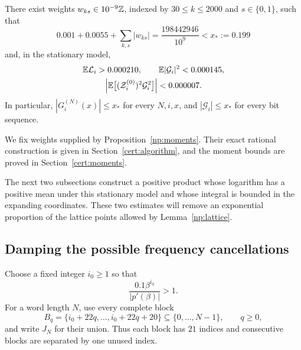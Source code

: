 \begin{proposition}\label{np:moments}\label{np:moment-bounds}
There exist weights \(w_{ks}\in10^{-9}\mathbb Z\), indexed by
\(30\le k\le2000\) and \(s\in\{0,1\}\), such that
\begin{equation}
 0.001+0.0055+\sum_{k,s}|w_{ks}|
   =\frac{198442946}{10^9}<x_*:=0.199
 \label{np:weight-sum}
\end{equation}
and, in the stationary model,
\begin{equation}
 \begin{gathered}
 \mathbb E\mathcal L_i>0.000210,\qquad
 \mathbb E|\mathcal G_i|^2<0.000145,\\
 \left|\mathbb E\bigl[(\mathcal Z_i^{(0)})^2\mathcal G_i^2\bigr]\right|
     <0.000007.
 \end{gathered}
 \label{np:moment-estimates}
\end{equation}
In particular, \(|G_i^{(N)}(x)|\le x_*\) for every \(N,i,x\), and
\(|\mathcal G_i|\le x_*\) for every bit sequence.
\end{proposition}

We fix weights supplied by Proposition~\ref{np:moments}. Their exact
rational construction is given in Section~\ref{cert:algorithm}, and the
moment bounds are proved in Section~\ref{cert:moments}.

The next two subsections construct a positive product whose logarithm has a
positive mean under this stationary model and whose integral is bounded in
the expanding coordinates. These two estimates will remove
an exponential proportion of the lattice points allowed by
Lemma~\ref{np:lattice}.

\subsection{Damping the possible frequency cancellations}
\label{np:damping-section}

Choose a fixed integer \(i_0\ge1\) so that
\begin{equation}
 \frac{0.1\beta^{i_0}}{|p'(\beta)|}>1.
 \label{np:initial-index}
\end{equation}
For a word length \(N\), use every complete block
\[
 B_q=\{i_0+22q,\ldots,i_0+22q+20\}\subseteq\{0,\ldots,N-1\},
 \qquad q\ge0,
\]
and write \(J_N\) for their union. Thus each block has \(21\) indices and
consecutive blocks are separated by one unused index.

